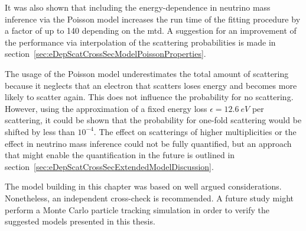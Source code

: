It was also shown that including the energy-dependence in neutrino mass inference via the Poisson model increases the run time of the fitting procedure by a factor of up to 140 depending on the \gls{mtd}. A suggestion for an improvement of the performance via interpolation of the scattering probabilities is made in section~\ref{sec:eDepScatCrossSecModelPoissonProperties}.

The usage of the Poisson model underestimates the total amount of scattering because it neglects that an electron that scatters loses energy and becomes more likely to scatter again. This does not influence the probability for no scattering. However, using the approximation of a fixed energy loss $\epsilon=\SI{12.6}{eV}$ per scattering, it could be shown that the probability for one-fold scattering would be shifted by less than $10^{-4}$. The effect on scatterings of higher multiplicities or the effect in neutrino mass inference could not be fully quantified, but an approach that might enable the quantification in the future is outlined in section~\ref{sec:eDepScatCrossSecExtendedModelDiscussion}.

The model building in this chapter was based on well argued considerations. Nonetheless, an independent cross-check is recommended. A future study might perform a Monte Carlo particle tracking simulation in order to verify the suggested models presented in this thesis.
